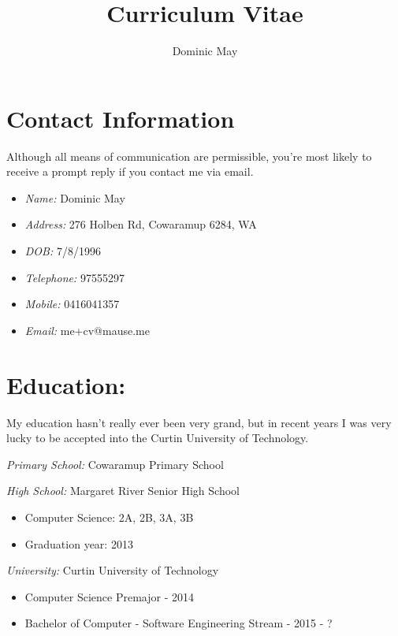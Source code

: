 \documentclass{article}
\begin{document}
\title{Curriculum Vitae}
\author{Dominic May}

\maketitle
\tableofcontents
\newpage

\section{Contact Information}
  Although all means of communication are permissible, you're most likely to
  receive a prompt reply if you contact me via email.
  \begin{itemize}
    \item \emph{Name:} Dominic May

    \item \emph{Address:} 276 Holben Rd, Cowaramup 6284, WA

    \item \emph{DOB:} 7/8/1996

    \item \emph{Telephone:} 97555297

    \item \emph{Mobile:} 0416041357

    \item \emph{Email:} me+cv@mause.me
  \end{itemize}

\section{Education:}
  My education hasn't really ever been very grand, but in recent years I was
  very lucky to be accepted into the Curtin University of Technology.

  \emph{Primary School:} Cowaramup Primary School

  \emph{High School:} Margaret River Senior High School
  \begin{itemize}
    \item Computer Science: 2A, 2B, 3A, 3B
    \item Graduation year: 2013
  \end{itemize}

  \emph{University:} Curtin University of Technology
  \begin{itemize}
    \item Computer Science Premajor - 2014
    \item Bachelor of Computer - Software Engineering Stream - 2015 - ?
  \end{itemize}
\end{document}
